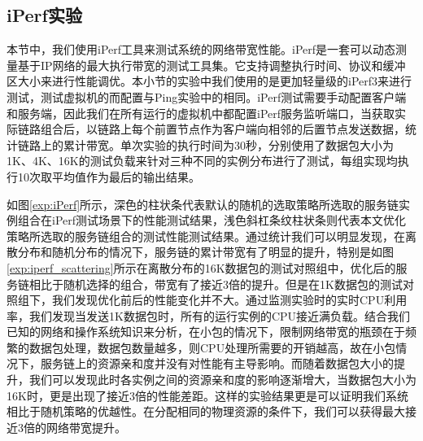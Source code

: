 \subsection{iPerf实验}
本节中，我们使用iPerf工具来测试系统的网络带宽性能。iPerf是一套可以动态测量基于IP网络的最大执行带宽的测试工具集。它支持调整执行时间、协议和缓冲区大小来进行性能调优。本小节的实验中我们使用的是更加轻量级的iPerf3来进行测试，测试虚拟机的而配置与Ping实验中的相同。iPerf测试需要手动配置客户端和服务端，因此我们在所有运行的虚拟机中都配置iPerf服务监听端口，当获取实际链路组合后，以链路上每个前置节点作为客户端向相邻的后置节点发送数据，统计链路上的累计带宽。单次实验的执行时间为30秒，分别使用了数据包大小为1K、4K、16K的测试负载来针对三种不同的实例分布进行了测试，每组实现均执行10次取平均值作为最后的输出结果。
\begin{figure}[!htp]
	\centering
\end{figure}
\begin{figure}
	\addtocounter{subfigure}{2}
	\ContinuedFloat
	\centering
\end{figure}

如图\ref{exp:iPerf}所示，深色的柱状条代表默认的随机的选取策略所选取的服务链实例组合在iPerf测试场景下的性能测试结果，浅色斜杠条纹柱状条则代表本文优化策略所选取的服务链组合的测试性能测试结果。通过统计我们可以明显发现，在离散分布和随机分布的情况下，服务链的累计带宽有了明显的提升，特别是如图\ref{exp:iperf_scattering}所示在离散分布的16K数据包的测试对照组中，优化后的服务链相比于随机选择的组合，带宽有了接近3倍的提升。但是在1K数据包的测试对照组下，我们发现优化前后的性能变化并不大。通过监测实验时的实时CPU利用率，我们发现当发送1K数据包时，所有的运行实例的CPU接近满负载。结合我们已知的网络和操作系统知识来分析，在小包的情况下，限制网络带宽的瓶颈在于频繁的数据包处理，数据包数量越多，则CPU处理所需要的开销越高，故在小包情况下，服务链上的资源亲和度并没有对性能有主导影响。而随着数据包大小的提升，我们可以发现此时各实例之间的资源亲和度的影响逐渐增大，当数据包大小为16K时，更是出现了接近3倍的性能差距。这样的实验结果更是可以证明我们系统相比于随机策略的优越性。在分配相同的物理资源的条件下，我们可以获得最大接近3倍的网络带宽提升。

